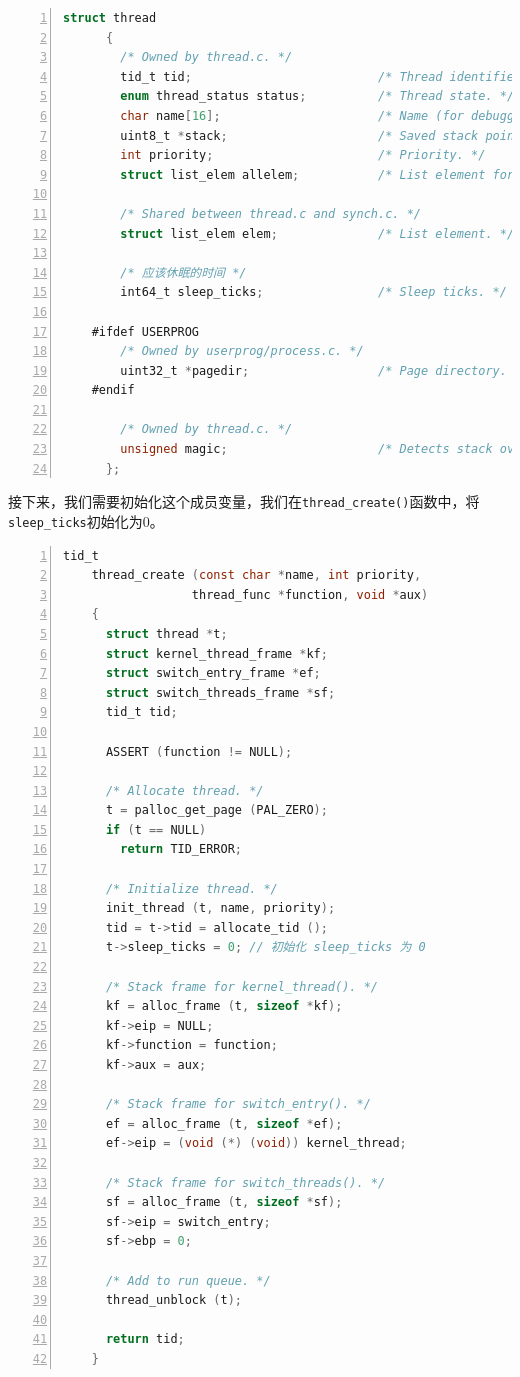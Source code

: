 \documentclass{article}
\begin{document}
\begin{lstlisting}[xleftmargin = 4em,xrightmargin = 4em, aboveskip = 1em, numbers = left, language = C, title=修改后的线程结构体]
    struct thread
      {
        /* Owned by thread.c. */
        tid_t tid;                          /* Thread identifier. */
        enum thread_status status;          /* Thread state. */
        char name[16];                      /* Name (for debugging purposes). */
        uint8_t *stack;                     /* Saved stack pointer. */
        int priority;                       /* Priority. */
        struct list_elem allelem;           /* List element for all threads list. */

        /* Shared between thread.c and synch.c. */
        struct list_elem elem;              /* List element. */

        /* 应该休眠的时间 */
        int64_t sleep_ticks;                /* Sleep ticks. */

    #ifdef USERPROG
        /* Owned by userprog/process.c. */
        uint32_t *pagedir;                  /* Page directory. */
    #endif

        /* Owned by thread.c. */
        unsigned magic;                     /* Detects stack overflow. */
      };
\end{lstlisting}

接下来，我们需要初始化这个成员变量，我们在\texttt{thread\_create()}函数中，将\texttt{sleep\_ticks}初始化为0。

\begin{lstlisting}[xleftmargin = 4em,xrightmargin = 4em, aboveskip = 1em, numbers = left, language = C, title=修改后的\texttt{thread\_create()}函数]
    tid_t
    thread_create (const char *name, int priority,
                  thread_func *function, void *aux) 
    {
      struct thread *t;
      struct kernel_thread_frame *kf;
      struct switch_entry_frame *ef;
      struct switch_threads_frame *sf;
      tid_t tid;
    
      ASSERT (function != NULL);
    
      /* Allocate thread. */
      t = palloc_get_page (PAL_ZERO);
      if (t == NULL)
        return TID_ERROR;
    
      /* Initialize thread. */
      init_thread (t, name, priority);
      tid = t->tid = allocate_tid ();
      t->sleep_ticks = 0; // 初始化 sleep_ticks 为 0
    
      /* Stack frame for kernel_thread(). */
      kf = alloc_frame (t, sizeof *kf);
      kf->eip = NULL;
      kf->function = function;
      kf->aux = aux;
    
      /* Stack frame for switch_entry(). */
      ef = alloc_frame (t, sizeof *ef);
      ef->eip = (void (*) (void)) kernel_thread;
    
      /* Stack frame for switch_threads(). */
      sf = alloc_frame (t, sizeof *sf);
      sf->eip = switch_entry;
      sf->ebp = 0;
    
      /* Add to run queue. */
      thread_unblock (t);
    
      return tid;
    }
\end{lstlisting}
\end{document}
